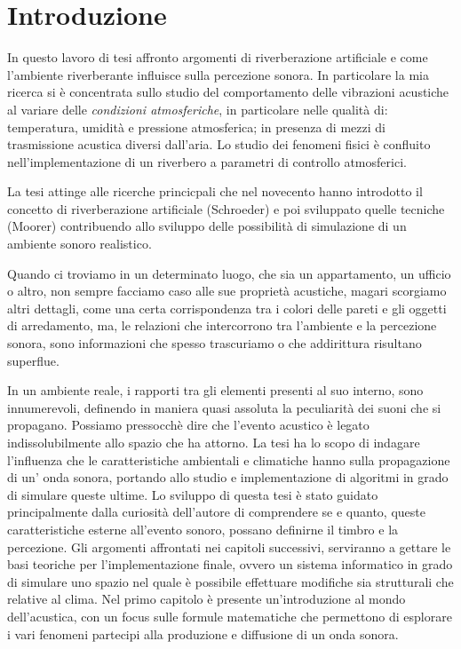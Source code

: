 \chapter*{Introduzione}
\label{chp:Introduzione}

In questo lavoro di tesi affronto argomenti di riverberazione artificiale e
come l'ambiente riverberante influisce sulla percezione sonora. In particolare
la mia ricerca si è concentrata sullo studio del comportamento delle vibrazioni
acustiche al variare delle \emph{condizioni atmosferiche}, in particolare nelle
qualità di: temperatura, umidità e pressione atmosferica; in presenza di mezzi
di trasmissione acustica diversi dall’aria. Lo studio dei fenomeni fisici è
confluito nell'implementazione di un riverbero a parametri di controllo
atmosferici.

La tesi attinge alle ricerche princicpali che nel novecento hanno introdotto il
concetto di riverberazione artificiale (Schroeder) e poi sviluppato quelle
tecniche (Moorer) contribuendo allo sviluppo delle possibilità di simulazione di
un ambiente sonoro realistico.

Quando ci troviamo in un determinato luogo, che sia un appartamento, un ufficio o altro, non sempre facciamo caso alle sue proprietà acustiche, magari scorgiamo altri dettagli, come una certa corrispondenza tra i colori delle pareti e gli oggetti di arredamento, ma, le relazioni che intercorrono tra l’ambiente e la percezione sonora, sono informazioni che spesso trascuriamo o che addirittura risultano superflue.

In un ambiente reale, i rapporti tra gli elementi presenti al suo interno, sono innumerevoli, definendo in maniera quasi assoluta la peculiarità dei suoni che si propagano. Possiamo pressocchè dire che l’evento acustico è legato indissolubilmente allo spazio che ha attorno. La tesi ha lo scopo di indagare l’influenza che le caratteristiche ambientali e climatiche hanno sulla propagazione di un’ onda sonora, portando allo studio e implementazione di algoritmi in grado di simulare queste ultime. Lo sviluppo di questa tesi è stato guidato principalmente dalla curiosità dell’autore di comprendere se e quanto, queste caratteristiche esterne all’evento sonoro, possano definirne il timbro e la percezione.
Gli argomenti affrontati nei capitoli successivi, serviranno a gettare le basi teoriche per l’implementazione finale, ovvero un sistema informatico in grado di simulare uno spazio nel quale è possibile effettuare modifiche sia strutturali che relative al clima.
Nel primo capitolo è presente un’introduzione al mondo dell’acustica, con un focus sulle formule matematiche che permettono di esplorare i vari fenomeni partecipi alla produzione e diffusione di un onda sonora.

